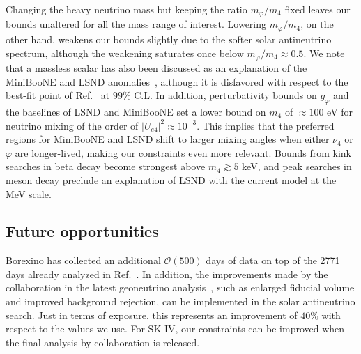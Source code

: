 \documentclass[
reprint,
superscriptaddress,
showpacs,
preprintnumbers,
nofootinbib,
nobibnotes,
amsmath,
amssymb, 
aps,
prd,
floatfix
]{revtex4-1}
\renewcommand{\phi}{\varphi}
\begin{document}
Changing the heavy neutrino mass but keeping the ratio $m_\phi/m_4$ fixed leaves our bounds unaltered for all the mass range of interest. Lowering $m_\phi/m_4$, on the other hand, weakens our bounds slightly due to the softer solar antineutrino spectrum, although the weakening saturates once below $m_\phi/m_4 \approx 0.5$. We note that a massless scalar has also been discussed as an explanation of the MiniBooNE and LSND anomalies~\cite{deGouvea:2019qre}, although it is disfavored with respect to the best-fit point of Ref.~\cite{Dentler:2019dhz} at $99\%$ C.L. In addition, perturbativity bounds on $g_\phi$ and the baselines of LSND and MiniBooNE set a lower bound on $m_4$ of $\approx 100$ eV for neutrino mixing of the order of $|U_{e4}|^2\approx10^{-3}$. This implies that the preferred regions for MiniBooNE and LSND shift to larger mixing angles when either $\nu_4$ or $\phi$ are longer-lived, making our constraints even more relevant. Bounds from kink searches in beta decay become strongest above $m_4 \gtrsim 5$ keV, and peak searches in meson decay preclude an explanation of LSND with the current model at the MeV scale.

\subsection{Future opportunities}

Borexino has collected an additional $\mathcal{O}(500)$ days of data on top of the 2771 days already analyzed in Ref.~\cite{Agostini:2019yuq}. In addition, the improvements made by the collaboration in the latest geoneutrino analysis~\cite{Agostini:2019dbs}, such as enlarged fiducial volume and improved background rejection, can be implemented in the solar antineutrino search. Just in terms of exposure, this represents an improvement of $40\%$ with respect to the values we use. For SK-IV, our constraints can be improved when the final analysis by collaboration is released. 

\end{document}
